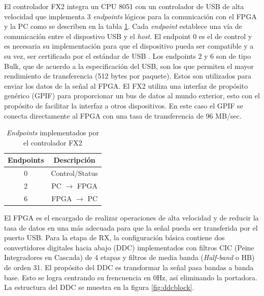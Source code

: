 El controlador FX2 integra un CPU 8051 con un controlador de USB de alta velocidad que implementa 3
\emph{endpoints} l\'ogicos para la comunicaci\'on con el FPGA y la PC como se describen en la tabla
\ref{tbl:endpoints}. Cada \emph{endpoint} establece una v\'ia de comunicaci\'on entre el dispostivo
USB y el \emph{host}. El endpoint 0 es el de control y es necesaria su implementaci\'on para que el
dispositivo pueda ser compatible y a su vez, ser certificado por el est\'andar de USB \cite{usb}.
Los endpoints 2 y 6 son de tipo Bulk, que de acuerdo a la especificaci\'on del USB, son los que
permiten el mayor rendimiento de transferencia (512 bytes por paquete). Estos son utilizados para
enviar los datos de la se\~nal al FPGA. El FX2 utiliza una interfaz de prop\'osito gen\'erico (GPIF)
para proporcionar un bus de datos al mundo exterior, esto con el prop\'osito de facilitar la
interfaz a otros dispositivos. En este caso el GPIF se conecta directamente al FPGA con una tasa de
transferencia de 96 MB/sec.

\begin{table}[htp]
\begin{center}
	\begin{tabular}{|c|c|}
		\hline
		\textbf{Endpoints} & \textbf{Descripci\'on} \\
		\hline
		0 & Control/Status \\
		\hline
		2 & PC $\rightarrow$ FPGA \\
		\hline
		6 & FPGA $\rightarrow$ PC \\
		\hline
	\end{tabular}
	\vspace{0.5in}
	\caption{\emph{Endpoints} implementados por el controlador FX2}
	\label{tbl:endpoints}
\end{center}
\end{table}

El FPGA es el encargado de realizar operaciones de alta velocidad y de reducir
la tasa de datos en una m\'as adecuada para que la se\~nal pueda ser transferida
por el puerto USB. Para la etapa de RX, la configuraci\'on b\'asica contiene dos
convertidores digitales hacia abajo (DDC) implementados con filtros CIC (Peine
Integradores en Cascada) de 4 etapas y filtros de media banda (\emph{Half-band}
o HB) de orden 31. El prop\'osito del DDC es transformar la se\~nal pasa bandas a banda base. Esto
se logra centrando su frencuencia en 0Hz, as\'i eliminando la portadora. La estructura del
DDC se muestra en la figura \ref{fig:ddcblock}.

